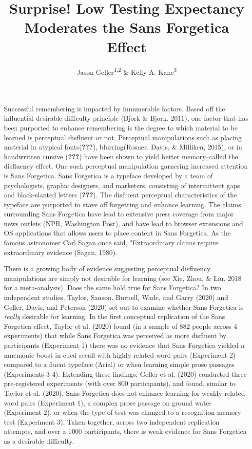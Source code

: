 \documentclass[
  english,
  jou]{apa6}
\title{Surprise! Low Testing Expectancy Moderates the Sans Forgetica Effect}
\author{Jason Geller\textsuperscript{1,2} \& Kelly A. Kane\textsuperscript{3}}
\date{}
\affiliation{\vspace{0.5cm}\textsuperscript{1} University of Iowa\\\textsuperscript{2} Rutgers University Center for Cognitive Science\\\textsuperscript{3} Glenville State College}
\begin{document}
\maketitle

Successful remembering is impacted by innumerable factors. Based off the influential desirable difficulty principle (Bjork \& Bjork, 2011), one factor that has been purported to enhance remembering is the degree to which material to be learned is perceptual disfluent or not. Perceptual manipulations such as placing material in atypical fonts({\textbf{???}}), blurring(Rosner, Davis, \& Milliken, 2015), or in handwritten cursive ({\textbf{???}}) have been shown to yield better memory--called the disfluency effect. One such perceptual manipulation garnering increased attention is Sans Forgetica. Sans Forgetica is a typeface developed by a team of psychologists, graphic designers, and marketers, consisting of intermittent gaps and black-slanted letters ({\textbf{???}}). The disfluent perceptual characteristics of the typeface are purported to stave off forgetting and enhance learning. The claims surrounding Sans Forgetica have lead to extensive press coverage from major news outlets (NPR, Washington Post), and have lead to browser extensions and OS applications that allows users to place content in Sans Forgetica. As the famous astronomer Carl Sagan once said, "Extraordinary claims require extraordinary evidence (Sagan, 1980).

There is a growing body of evidence suggesting perceptual disfluency manipulations are simply not desirable for learning (see Xie, Zhou, \& Liu, 2018 for a meta-analysis). Does the same hold true for Sans Forgetica? In two independent studies, Taylor, Sanson, Burnell, Wade, and Garry (2020) and Geller, Davis, and Peterson (2020) set out to examine whether Sans Forgetica is \emph{really} desirable for learning. In the first conceptual replication of the Sans Forgetica effect, Taylor et al. (2020) found (in a sample of 882 people across 4 experiments) that while Sans Forgetica was perceived as more disfluent by participants (Experiment 1) there was no evidence that Sans Forgetica yielded a mnemonic boost in cued recall with highly related word pairs (Experiment 2) compared to a fluent typeface (Arial) or when learning simple prose passages (Experiments 3-4). Extending these findings, Geller et al. (2020) conducted three pre-registered experiments (with over 800 participants), and found, similar to Taylor et al. (2020), Sans Forgetica does not enhance learning for weakly related word pairs (Experiment 1), a complex prose passage on ground water (Experiment 2), or when the type of test was changed to a recognition memory test (Experiment 3). Taken together, across two independent replication attempts, and over a 1000 participants, there is weak evidence for Sans Forgetica as a desirable difficulty.
\end{document}
